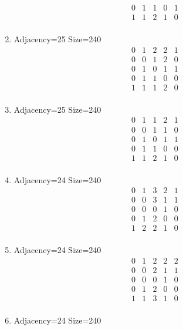 \documentclass[12pt]{article}
\begin{document}
\begin{multicols}{3}
\begin{enumerate}
\begin{equation*}
\begin{array}{ccccc}
0&1&1&0&1\\
1&1&2&1&0\\
\end{array}
\end{equation*}
\item Adjacency=25 Size=240
\begin{equation*}
\begin{array}{ccccc}
0&1&2&2&1\\
0&0&1&2&0\\
0&1&0&1&1\\
0&1&1&0&0\\
1&1&1&2&0\\
\end{array}
\end{equation*}
\item Adjacency=25 Size=240
\begin{equation*}
\begin{array}{ccccc}
0&1&1&2&1\\
0&0&1&1&0\\
0&1&0&1&1\\
0&1&1&0&0\\
1&1&2&1&0\\
\end{array}
\end{equation*}
\item Adjacency=24 Size=240
\begin{equation*}
\begin{array}{ccccc}
0&1&3&2&1\\
0&0&3&1&1\\
0&0&0&1&0\\
0&1&2&0&0\\
1&2&2&1&0\\
\end{array}
\end{equation*}
\item Adjacency=24 Size=240
\begin{equation*}
\begin{array}{ccccc}
0&1&2&2&2\\
0&0&2&1&1\\
0&0&0&1&0\\
0&1&2&0&0\\
1&1&3&1&0\\
\end{array}
\end{equation*}
\item Adjacency=24 Size=240
\begin{equation*}
\begin{array}{ccccc}

\end{array}
\end{equation*}
\end{enumerate}
\end{multicols}
\end{document}

